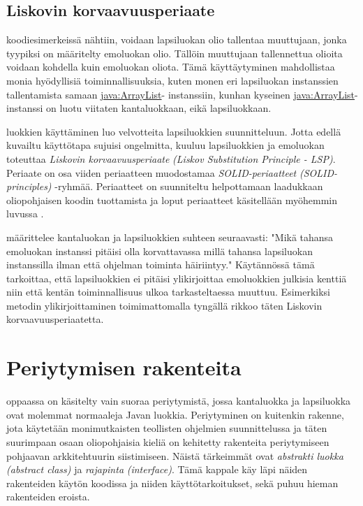 \documentclass[a4paper,justified,notoc]{tufte-book}
\newcommand{\eng}[1]{\textit{(#1)}}
\newcommand{\new}[1]{\textit{\gls{#1}}}
\newcommand{\neweng}[2]{\new{#1} \eng{#2}}
\newcommand{\java}[1]{\underline{\gls{java:#1}}}
\begin{document}
\begin{fullwidth}
\subsection{Liskovin korvaavuusperiaate}
\label{LSP}

  koodiesimerkeissä nähtiin, voidaan lapsiluokan olio
tallentaa muuttujaan, jonka tyypiksi on määritelty emoluokan olio. Tällöin muuttujaan tallennettua
olioita voidaan kohdella kuin emoluokan oliota. Tämä käyttäytyminen mahdollistaa monia hyödyllisiä
toiminnallisuuksia, kuten monen eri lapsiluokan instanssien tallentamista samaan \java{ArrayList}-
instanssiin, kunhan kyseinen \java{ArrayList}-instanssi on luotu viitaten kantaluokkaan, eikä
lapsiluokkaan.

 luokkien käyttäminen luo velvotteita lapsiluokkien suunnitteluun.
Jotta edellä kuvailtu käyttötapa sujuisi ongelmitta, kuuluu lapsiluokkien ja emoluokan toteuttaa
\neweng{Liskovin korvaavuusperiaate}{Liskov Substitution Principle - LSP}. Periaate on osa
viiden periaatteen muodostamaa \neweng{SOLID-periaatteet}{SOLID-principles} -ryhmää. Periaatteet
on suunniteltu helpottamaan laadukkaan oliopohjaisen koodin tuottamista ja loput periaatteet
käsitellään myöhemmin luvussa .

 määrittelee kantaluokan ja lapsiluokkien suhteen
seuraavasti: "Mikä tahansa emoluokan instanssi pitäisi olla korvattavassa millä tahansa 
lapsiluokan instanssilla ilman että ohjelman toiminta häiriintyy." Käytännössä tämä tarkoittaa,
että lapsiluokkien ei pitäisi ylikirjoittaa emoluokkien julkisia kenttiä niin että kentän
toiminnallisuus ulkoa tarkasteltaessa muuttuu. Esimerkiksi metodin ylikirjoittaminen
toimimattomalla tyngällä rikkoo täten Liskovin korvaavuusperiaatetta.


\section{Periytymisen rakenteita}
\label{periytyminen5}

 oppaassa on käsitelty vain suoraa periytymistä, jossa
\gls{kantaluokka} ja \gls{lapsiluokka} ovat molemmat normaaleja Javan luokkia. Periytyminen on
kuitenkin rakenne, jota käytetään monimutkaisten teollisten ohjelmien suunnittelussa ja täten
suurimpaan osaan oliopohjaisia kieliä on kehitetty rakenteita periytymiseen pohjaavan
arkkitehtuurin siistimiseen. Näistä tärkeimmät ovat \neweng{abstrakti luokka}{abstract class} ja
\neweng{rajapinta}{interface}. Tämä kappale käy läpi näiden rakenteiden käytön koodissa ja niiden
käyttötarkoitukset, sekä puhuu hieman rakenteiden eroista.


\end{fullwidth}
\end{document}
